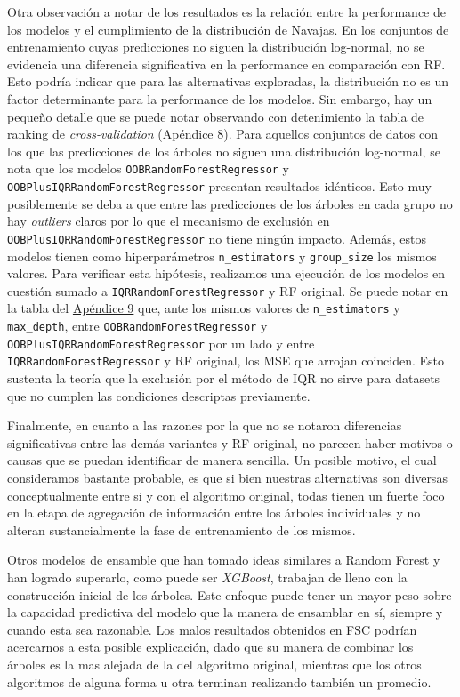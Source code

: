 Otra observación a notar de los resultados es la relación entre la performance de los modelos y el cumplimiento de la distribución de Navajas. En los conjuntos de entrenamiento cuyas predicciones no siguen la distribución log-normal, no se evidencia una diferencia significativa en la performance en comparación con RF. Esto podría indicar que para las alternativas exploradas, la distribución no es un factor determinante para la performance de los modelos. Sin embargo, hay un pequeño detalle que se puede notar observando con detenimiento la tabla de ranking de \textit{cross-validation} (\hyperref[appendix8]{Apéndice 8}). Para aquellos conjuntos de datos con los que las predicciones de los árboles no siguen una distribución log-normal, se nota que los modelos \texttt{OOBRandomForestRegressor} y \texttt{OOBPlusIQRRandomForestRegressor} presentan resultados idénticos. Esto muy posiblemente se deba a que entre las predicciones de los árboles en cada grupo no hay \textit{outliers} claros por lo que el mecanismo de exclusión en \texttt{OOBPlusIQRRandomForestRegressor} no tiene ningún impacto. Además, estos modelos tienen como hiperparámetros \texttt{n\_estimators} y \texttt{group\_size} los mismos valores. Para verificar esta hipótesis, realizamos una ejecución de los modelos en cuestión sumado a \texttt{IQRRandomForestRegressor} y RF original. Se puede notar en la tabla del \hyperref[appendix9]{Apéndice 9} que, ante los mismos valores de \texttt{n\_estimators} y \texttt{max\_depth}, entre \texttt{OOBRandomForestRegressor} y \texttt{OOBPlusIQRRandomForestRegressor} por un lado y entre \texttt{IQRRandomForestRegressor} y RF original, los MSE que arrojan coinciden. Esto sustenta la teoría que la exclusión por el método de IQR no sirve para datasets que no cumplen las condiciones descriptas previamente.

Finalmente, en cuanto a las razones por la que no se notaron diferencias significativas entre las demás variantes y RF original, no parecen haber motivos o causas que se puedan identificar de manera sencilla. Un posible motivo, el cual consideramos bastante probable, es que si bien nuestras alternativas son diversas conceptualmente entre si y con el algoritmo original, todas tienen un fuerte foco en la etapa de agregación de información entre los árboles individuales y no alteran sustancialmente la fase de entrenamiento de los mismos. 

Otros modelos de ensamble que han tomado ideas similares a Random Forest y han logrado superarlo, como puede ser \textit{XGBoost}, trabajan de lleno con la construcción inicial de los árboles. Este enfoque puede tener un mayor peso sobre la capacidad predictiva del modelo que la manera de ensamblar en sí, siempre y cuando esta sea razonable. Los malos resultados obtenidos en FSC podrían acercarnos a esta posible explicación, dado que su manera de combinar los árboles es la mas alejada de la del algoritmo original, mientras que los otros algoritmos de alguna forma u otra terminan realizando también un promedio.

